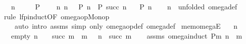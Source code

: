 \begin{isabellebody}
\ \ \ {\isachardoublequoteopen}n\ {\isasymin}\ {\isasymomega}{\isachardoublequoteclose}\isanewline
\ \ \ {\isachardoublequoteopen}P\ {\isacharbraceleft}{\kern0pt}{\isacharbraceright}{\kern0pt}{\isachardoublequoteclose}\isanewline
\ \ \ {\isachardoublequoteopen}{\isasymAnd}n{\isachardot}{\kern0pt}\ {\isasymlbrakk}n\ {\isasymin}\ {\isasymomega}{\isacharsemicolon}{\kern0pt}\ P\ n{\isasymrbrakk}\ {\isasymLongrightarrow}\ P\ {\isacharparenleft}{\kern0pt}succ\ n{\isacharparenright}{\kern0pt}{\isachardoublequoteclose}\isanewline
\ \ \ {\isachardoublequoteopen}P\ n{\isachardoublequoteclose}\isanewline
%
\isadelimproof
\ \ %
\endisadelimproof
%
\isatagproof
{}\isamarkupfalse%
\ {\isacartoucheopen}n\ {\isasymin}\ {\isasymomega}{\isacartoucheclose}{\isacharbrackleft}{\kern0pt}unfolded\ omega{\isacharunderscore}{\kern0pt}def{\isacharbrackright}{\kern0pt}\isanewline
\ \ \isamarkupfalse%
\ {\isacharparenleft}{\kern0pt}rule\ lfp{\isacharunderscore}{\kern0pt}induct{\isacharbrackleft}{\kern0pt}OF\ omega{\isacharunderscore}{\kern0pt}op{\isacharunderscore}{\kern0pt}Monop{\isacharbrackright}{\kern0pt}{\isacharparenright}{\kern0pt}\isanewline
\ \ \ \ {\isacharparenleft}{\kern0pt}auto\ intro{\isacharcolon}{\kern0pt}\ assms{\isacharparenleft}{\kern0pt}{}{\isacharminus}{\kern0pt}{}{\isacharparenright}{\kern0pt}\ simp\ only{\isacharcolon}{\kern0pt}\ omega{\isacharunderscore}{\kern0pt}op{\isacharunderscore}{\kern0pt}def\ omega{\isacharunderscore}{\kern0pt}def{\isacharparenright}{\kern0pt}%
\endisatagproof
{\isafoldproof}%
%
\isadelimproof
\isanewline
%
\endisadelimproof
\isanewline
{}\isamarkupfalse%
\ mem{\isacharunderscore}{\kern0pt}omegaE{\isacharcolon}{\kern0pt}\isanewline
\ \ \ {\isachardoublequoteopen}n\ {\isasymin}\ {\isasymomega}{\isachardoublequoteclose}\isanewline
\ \ \ {\isacharparenleft}{\kern0pt}empty{\isacharparenright}{\kern0pt}\ {\isachardoublequoteopen}n\ {\isacharequal}{\kern0pt}\ {\isacharbraceleft}{\kern0pt}{\isacharbraceright}{\kern0pt}{\isachardoublequoteclose}\ {\isacharbar}{\kern0pt}\ {\isacharparenleft}{\kern0pt}succ{\isacharparenright}{\kern0pt}\ m\ \ {\isachardoublequoteopen}m\ {\isasymin}\ {\isasymomega}{\isachardoublequoteclose}\ {\isachardoublequoteopen}n\ {\isacharequal}{\kern0pt}\ succ\ m{\isachardoublequoteclose}\isanewline
%
\isadelimproof
\ \ %
\endisadelimproof
%
\isatagproof
{}\isamarkupfalse%
\ assms\ omega{\isacharunderscore}{\kern0pt}induct{\isacharbrackleft}{\kern0pt}\ {\isacharquery}{\kern0pt}P{\isacharequal}{\kern0pt}{\isachardoublequoteopen}{\isasymlambda}m{\isachardot}{\kern0pt}\ n\ {\isacharequal}{\kern0pt}\ m\ {\isasymlongrightarrow}\ {\isacharunderscore}{\kern0pt}{\isachardoublequoteclose}{\isacharbrackright}{\kern0pt}\ \isamarkupfalse%

\end{isabellebody}
